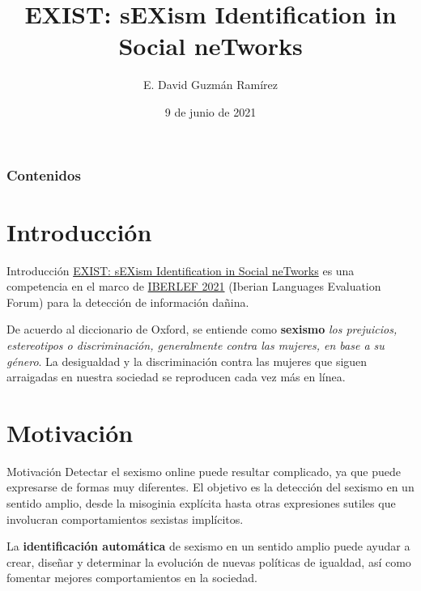 \documentclass[10pt]{beamer}
\title[Shared Task at IberLEF 2021]{EXIST: sEXism Identification in Social neTworks} %
\author[David Guzmán]{E. David Guzmán Ramírez} %
\institute[IIMAS, UNAM] %
{	Licenciatura en Ciencia de Datos \\
	Minería de Textos \\ \medskip Dra. Helena Gómez Adorno \\ M. en C. Ricardo Montalvo Lezama}
\date{{\tiny 9 de junio de 2021}} %
\begin{document}
	
	
\begin{frame}
	\titlepage %
\end{frame}

\begin{frame}
\frametitle{Contenidos}
\justify

\tableofcontents
\end{frame}

\section{Introducción}
\begin{frame}{Introducción}
\justify
\small
\href{http://nlp.uned.es/exist2021/}{EXIST: sEXism Identification in Social neTworks} es una competencia en el marco de \href{https://sites.google.com/view/iberlef2021/home}{IBERLEF 2021} (Iberian Languages Evaluation Forum) para la detección de información dañina. \medskip

De acuerdo al diccionario de Oxford, se entiende como \textbf{sexismo} \emph{los prejuicios, estereotipos o discriminación, generalmente contra las mujeres, en base a su género}. La desigualdad y la discriminación contra las mujeres que siguen arraigadas en nuestra sociedad se reproducen cada vez más en línea. \medskip

\end{frame}


\section{Motivación}
\begin{frame}{Motivación}
\justify
\small
Detectar el sexismo online puede resultar complicado, ya que puede expresarse de formas muy diferentes. El objetivo es la detección del sexismo en un sentido amplio, desde la misoginia explícita hasta otras expresiones sutiles que involucran comportamientos sexistas implícitos. \medskip

La \textbf{identificación automática} de sexismo en un sentido amplio puede ayudar a crear, diseñar y determinar la evolución de nuevas políticas de igualdad, así como fomentar mejores comportamientos en la sociedad.
\end{frame}
\end{document}
